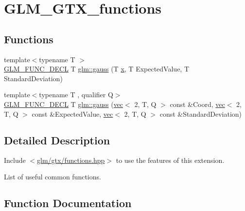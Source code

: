 \hypertarget{group__gtx__functions}{}\section{G\+L\+M\+\_\+\+G\+T\+X\+\_\+functions}
\label{group__gtx__functions}
\subsection*{Functions}
\begin{DoxyCompactItemize}
\item 
{\footnotesize template$<$typename T $>$ }\\\mbox{\hyperlink{setup_8hpp_ab2d052de21a70539923e9bcbf6e83a51}{G\+L\+M\+\_\+\+F\+U\+N\+C\+\_\+\+D\+E\+CL}} T \mbox{\hyperlink{group__gtx__functions_ga0b50b197ff74261a0fad90f4b8d24702}{glm\+::gauss}} (T \mbox{\hyperlink{_s_d_l__opengl_8h_ad0e63d0edcdbd3d79554076bf309fd47}{x}}, T Expected\+Value, T Standard\+Deviation)
\item 
{\footnotesize template$<$typename T , qualifier Q$>$ }\\\mbox{\hyperlink{setup_8hpp_ab2d052de21a70539923e9bcbf6e83a51}{G\+L\+M\+\_\+\+F\+U\+N\+C\+\_\+\+D\+E\+CL}} T \mbox{\hyperlink{group__gtx__functions_gad19ec8754a83c0b9a8dc16b7e60705ab}{glm\+::gauss}} (\mbox{\hyperlink{structglm_1_1vec}{vec}}$<$ 2, T, Q $>$ const \&Coord, \mbox{\hyperlink{structglm_1_1vec}{vec}}$<$ 2, T, Q $>$ const \&Expected\+Value, \mbox{\hyperlink{structglm_1_1vec}{vec}}$<$ 2, T, Q $>$ const \&Standard\+Deviation)
\end{DoxyCompactItemize}


\subsection{Detailed Description}
Include $<$\mbox{\hyperlink{functions_8hpp}{glm/gtx/functions.\+hpp}}$>$ to use the features of this extension.

List of useful common functions. 

\subsection{Function Documentation}
\mbox{\label{group__gtx__functions_ga0b50b197ff74261a0fad90f4b8d24702}} 
